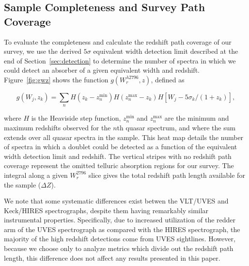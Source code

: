 \documentclass[iop,apj,numberedappendix,appendixfloats,twocolappendix]{emulateapj}
\begin{document}
\subsection{Sample Completeness and Survey Path Coverage}

\begin{figure*}[bth]
\caption{The function $g(W_r^{\lambda2796}, z)$ shown as a heat map with the colors representing the value of $g(W_r^{2796}, z)$. This is the number of spectra in which an absorption line of a given equivalent width and a given redshift may be detected according to the detection limit of the spectrum. The vertical black bars representing no redshift path length coverage show the omitted wavelength regions of the survey based upon contaminating telluric absorption features.}
\label{fig:gwz}
\end{figure*}

To evaluate the completeness and calculate the redshift path coverage of our survey, we use the derived $5\sigma$ equivalent width detection limit described at the end of Section~\ref{sec:detection} to determine the number of spectra in which we could detect an absorber of a given equivalent width and redshift. Figure~\ref{fig:gwz} shows the function $g(W_r^{\lambda2796}, z)$, defined as

\begin{equation}
g(W_j,z_k) = \sum_n H(z_k - z_n^{\mathrm{min}}) H(z_n^{\mathrm{max}} - z_k) H[W_j - 5\sigma_k / (1 + z_k)],
\label{eqn:gwz}
\end{equation}

\noindent where $H$ is the Heaviside step function, $z_n^{\mathrm{min}}$ and $z_n^{\mathrm{max}}$ are the minimum and maximum redshifts observed for the $n$th quasar spectrum, and where the sum extends over all quasar spectra in the sample. This heat map details the number of spectra in which a {\MgIIdblt} doublet could be detected as a function of the equivalent width detection limit and redshift. The vertical stripes with no redshift path coverage represent the omitted telluric absorption regions for our survey. The integral along a given $W_r^{2796}$ slice gives the total redshift path length available for the sample ($\Delta Z$).

We note that some systematic differences exist betwen the VLT/UVES and Keck/HIRES spectrographs, despite them having remarkably similar instrumental properties. Specifically, due to increased utilization of the redder arm of the UVES spectrograph as compared with the HIRES spectrograph, the majority of the high redshift detections come from UVES sightlines. However, because we choose only to analyze metrics which divide out the redshift path length, this difference does not affect any results presented in this paper.
\end{document}
